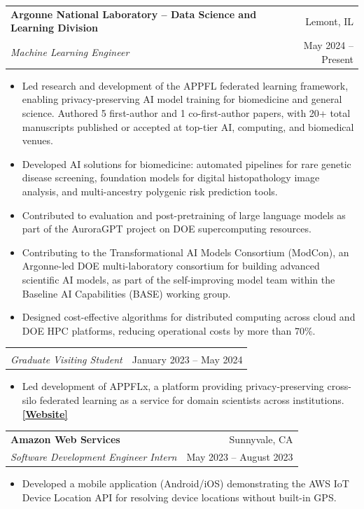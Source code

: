 \documentclass[letterpaper,11pt]{article}
\makeatletter
\newcommand{\CVSubheading}[4]{
  \vspace{-2pt}\item
    \begin{tabular*}{0.97\textwidth}[t]{l@{\extracolsep{\fill}}r}
      \textbf{#1} & #2 \\
      \small#3 & \small #4 \\
    \end{tabular*}\vspace{-7pt}
}
\makeatother
\begin{document}
\CVSubheading
{Argonne National Laboratory -- Data Science and Learning Division}{Lemont, IL}
{\textit{Machine Learning Engineer}}{May 2024 -- Present}
\begin{itemize}[leftmargin=0.5cm, label={$\bullet$}, topsep=2pt, itemsep=0pt]
  \small
  \item Led research and development of the APPFL federated learning framework, enabling privacy-preserving AI model training for biomedicine and general science. Authored 5 first-author and 1 co-first-author papers, with 20+ total manuscripts published or accepted at top-tier AI, computing, and biomedical venues.
  \item Developed AI solutions for biomedicine: automated pipelines for rare genetic disease screening, foundation models for digital histopathology image analysis, and multi-ancestry polygenic risk prediction tools.
  \item Contributed to evaluation and post-pretraining of large language models as part of the AuroraGPT project on DOE supercomputing resources.
  \item Contributing to the Transformational AI Models Consortium (ModCon), an Argonne-led DOE multi-laboratory consortium for building advanced scientific AI models, as part of the self-improving model team within the Baseline AI Capabilities (BASE) working group.
  \item Designed cost-effective algorithms for distributed computing across cloud and DOE HPC platforms, reducing operational costs by more than 70\%.
\end{itemize}

\vspace{-18pt}
\CVSubheading
{{}}{{}}
{\textit{Graduate Visiting Student}}{January 2023 -- May 2024}
\begin{itemize}[leftmargin=0.5cm, label={$\bullet$}, topsep=2pt, itemsep=0pt]
  \small
  \item Led development of APPFLx, a platform providing privacy-preserving cross-silo federated learning as a service for domain scientists across institutions. \href{https://appflx.link/}{\textbf{[Website]}}
\end{itemize}

\CVSubheading
{Amazon Web Services}{Sunnyvale, CA}
{\textit{Software Development Engineer Intern}}{May 2023 -- August 2023}
\begin{itemize}[leftmargin=0.5cm, label={$\bullet$}, topsep=2pt, itemsep=0pt]
  \small
  \item Developed a mobile application (Android/iOS) demonstrating the AWS IoT Device Location API for resolving device locations without built-in GPS.
\end{itemize}
\end{document}
